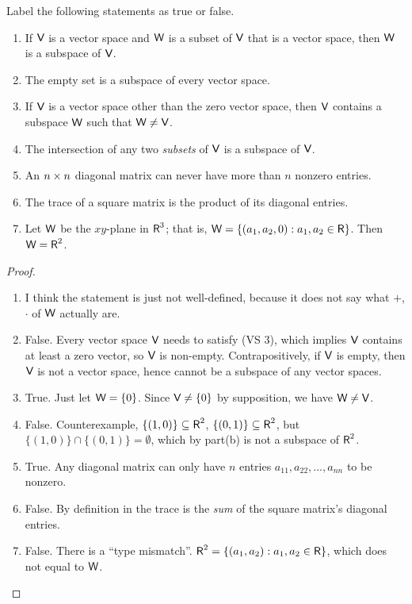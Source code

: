 \exercisesection

\begin{exercise} \label{exercise 1.3.1}
Label the following statements as true or false.
\begin{enumerate}
    \item If \(\textsf{V}\) is a vector space and \(\textsf{W}\) is a subset of \(\textsf{V}\) that is a vector space, then \(\textsf{W}\) is a subspace of \(\textsf{V}\).
    \item The empty set is a subspace of every vector space.
    \item If \(\textsf{V}\) is a vector space other than the zero vector space, then \(\textsf{V}\) contains a subspace \(\textsf{W}\) such that \(\textsf{W} \ne \textsf{V}\).
    \item The intersection of any two \emph{subsets} of \(\textsf{V}\) is a subspace of \(\textsf{V}\).
    \item An \(n \times n\) diagonal matrix can never have more than \(n\) nonzero entries.
    \item The trace of a square matrix is the product of its diagonal entries.
    \item Let \(\textsf{W}\) be the \(xy\)-plane in \(\textsf{R}^3\);
          that is, \(\textsf{W} = \{ (a_1, a_2, 0) : a_1, a_2 \in \textsf{R}\}\).
          Then \(\textsf{W} = \textsf{R}^2\).
\end{enumerate}
\end{exercise}

\begin{proof}\ 

\begin{enumerate}
    \item I think the statement is just not well-defined, because it does not say what \(+\),  \(\cdot\) of \(\textsf{W}\) actually are.
    \item False.
          Every vector space \(\textsf{V}\) needs to satisfy  (VS 3), which implies \(\textsf{V}\) contains at least a zero vector, so \(\textsf{V}\) is non-empty.
          Contrapositively, if \(\textsf{V}\) is empty, then \(\textsf{V}\) is not a vector space, hence cannot be a subspace of any vector spaces.
    \item True. Just let \(\textsf{W} = \{ 0 \}\). Since \(\textsf{V} \ne \{ 0 \}\) by supposition, we have \(\textsf{W} \ne \textsf{V}\).
    \item False.
          Counterexample, \(\{ (1, 0) \} \subseteq \textsf{R}^2\), \(\{ (0, 1) \} \subseteq \textsf{R}^2\), but \(\{ (1, 0) \} \cap \{ (0, 1) \} = \emptyset\), which by part(b) is not a subspace of \(\textsf{R}^2\).
    \item True.
          Any diagonal matrix can only have \(n\) entries \(a_{11}, a_{22}, ..., a_{nn}\) to be nonzero.
    \item False. By definition in  the trace is the \emph{sum} of the square matrix's diagonal entries.
    \item False. There is a ``type mismatch''.
          \(\textsf{R}^2 = \{ (a_1, a_2) : a_1, a_2 \in \textsf{R}\}\), which does not equal to \(\textsf{W}\).
\end{enumerate}
\end{proof}

